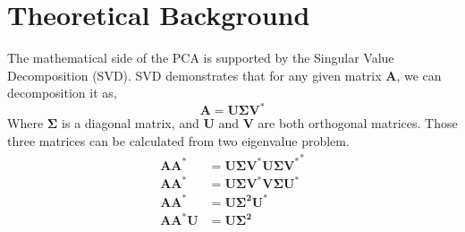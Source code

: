 \documentclass{article}
\begin{document}
\section{Theoretical Background}
The mathematical side of the PCA is supported by the Singular Value Decomposition (SVD). SVD demonstrates that for any given matrix \textbf{A}, we can decomposition it as,
\[
\mathbf{A} = \mathbf{U\Sigma V^*}
\]
Where $\mathbf{\Sigma}$ is a diagonal matrix, and $\mathbf{U}$ and $\mathbf{V}$ are both orthogonal matrices. Those three matrices can be calculated from two eigenvalue problem.
\begin{equation}
    \begin{aligned}
    \mathbf{AA^{*}} &=\mathbf{U\Sigma V^*}\mathbf{U\Sigma V^*}^*\\
    \mathbf{AA^{*}} &=\mathbf{U\Sigma V^*V\Sigma U^*} \\
    \mathbf{AA^{*}} &=\mathbf{U\Sigma^2 U^*} \\
    \mathbf{AA^{*}U} &=\mathbf{U\Sigma^2} \\
    \end{aligned}
\end{equation}
\end{document}
